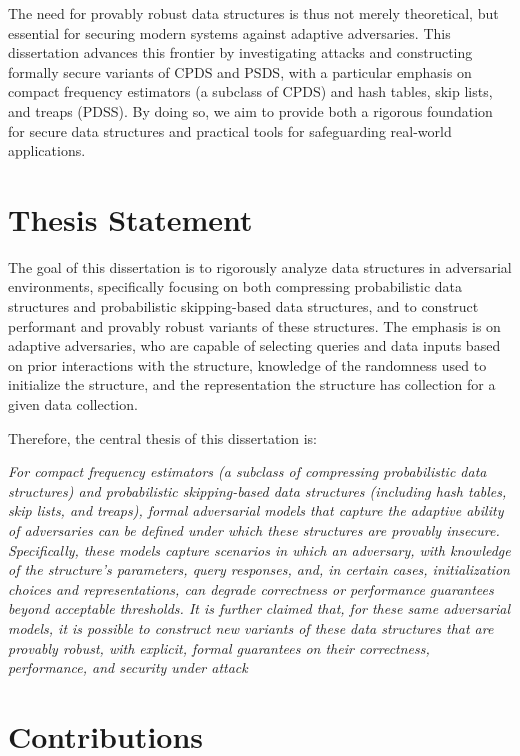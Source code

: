 The need for provably robust data structures is thus not merely theoretical, but essential for securing modern systems against adaptive adversaries. This dissertation advances this frontier by investigating attacks and constructing formally secure variants of CPDS and PSDS, with a particular emphasis on compact frequency estimators (a subclass of CPDS) and hash tables, skip lists, and treaps (PDSS). By doing so, we aim to provide both a rigorous foundation for secure data structures and practical tools for safeguarding real-world applications.

\section{Thesis Statement}

The goal of this dissertation is to rigorously analyze data structures in adversarial environments, specifically focusing on both compressing probabilistic data structures and probabilistic skipping-based data structures, and to construct performant and provably robust variants of these structures. The emphasis is on adaptive adversaries, who are capable of selecting queries and data inputs based on prior interactions with the structure, knowledge of the randomness used to initialize the structure, and the representation the structure has collection for a given data collection.

Therefore, the central thesis of this dissertation is:

\emph{For compact frequency estimators (a subclass of compressing probabilistic data structures) and probabilistic skipping-based data structures (including hash tables, skip lists, and treaps), formal adversarial models that capture the adaptive ability of adversaries can be defined under which these structures are provably insecure. Specifically, these models capture scenarios in which an adversary, with knowledge of the structure’s parameters, query responses, and, in certain cases, initialization choices and representations, can degrade correctness or performance guarantees beyond acceptable thresholds. It is further claimed that, for these same adversarial models, it is possible to construct new variants of these data structures that are provably robust, with explicit, formal guarantees on their correctness, performance, and security under attack}

\section{Contributions}

